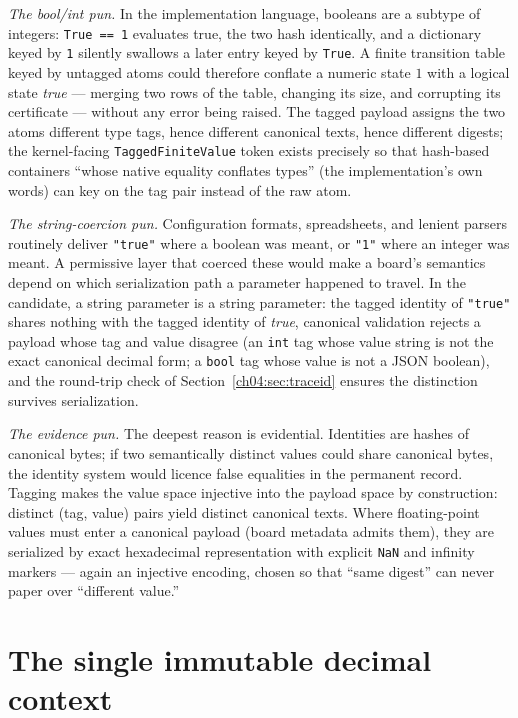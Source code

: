 \emph{The bool/int pun.} In the implementation language, booleans are a
subtype of integers: \texttt{True == 1} evaluates true, the two hash
identically, and a dictionary keyed by \texttt{1} silently swallows a later
entry keyed by \texttt{True}. A finite transition table keyed by untagged
atoms could therefore conflate a numeric state $1$ with a logical state
\emph{true} --- merging two rows of the table, changing its size, and
corrupting its certificate --- without any error being raised. The tagged
payload assigns the two atoms different type tags, hence different
canonical texts, hence different digests; the kernel-facing
\texttt{TaggedFiniteValue} token exists precisely so that hash-based
containers ``whose native equality conflates types'' (the implementation's
own words) can key on the tag pair instead of the raw atom.

\emph{The string-coercion pun.} Configuration formats, spreadsheets, and
lenient parsers routinely deliver \texttt{"true"} where a boolean was
meant, or \texttt{"1"} where an integer was meant. A permissive layer that
coerced these would make a board's semantics depend on which serialization
path a parameter happened to travel. In the candidate, a string parameter
is a string parameter: the tagged identity of \texttt{"true"} shares
nothing with the tagged identity of \emph{true}, canonical validation
rejects a payload whose tag and value disagree (an \texttt{int} tag whose
value string is not the exact canonical decimal form; a \texttt{bool} tag
whose value is not a JSON boolean), and the round-trip check of
Section~\ref{ch04:sec:traceid} ensures the distinction survives
serialization.

\emph{The evidence pun.} The deepest reason is evidential. Identities are
hashes of canonical bytes; if two semantically distinct values could share
canonical bytes, the identity system would licence false equalities in the
permanent record. Tagging makes the value space injective into the payload
space by construction: distinct (tag, value) pairs yield distinct
canonical texts. Where floating-point values must enter a canonical
payload (board metadata admits them), they are serialized by exact hexadecimal
representation with explicit \texttt{NaN} and infinity markers --- again an
injective encoding, chosen so that ``same digest'' can never paper over
``different value.''

\section{The single immutable decimal context}\label{ch04:sec:decimal}

